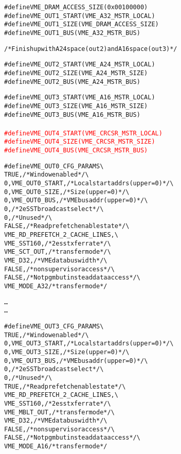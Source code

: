 \documentclass[11pt,a4paper]{article}
\begin{document}
\begin{framed}
\begin{alltt}
#define VME_DRAM_ACCESS_SIZE	(0x00100000)
#define VME_OUT1_START		(VME_A32_MSTR_LOCAL)
#define VME_OUT1_SIZE		(VME_DRAM_ACCESS_SIZE)
#define VME_OUT1_BUS            (VME_A32_MSTR_BUS)

/* Finish up with A24 space (out2) and A16 space (out3) */

#define VME_OUT2_START          (VME_A24_MSTR_LOCAL)
#define VME_OUT2_SIZE           (VME_A24_MSTR_SIZE)
#define VME_OUT2_BUS            (VME_A24_MSTR_BUS)

#define VME_OUT3_START          (VME_A16_MSTR_LOCAL)
#define VME_OUT3_SIZE           (VME_A16_MSTR_SIZE)
#define VME_OUT3_BUS            (VME_A16_MSTR_BUS)
\textcolor{red}{
#define VME_OUT4_START          (VME_CRCSR_MSTR_LOCAL)
#define VME_OUT4_SIZE           (VME_CRCSR_MSTR_SIZE)
#define VME_OUT4_BUS            (VME_CRCSR_MSTR_BUS)
}
    
#define VME_OUT0_CFG_PARAMS \verb|\|
             TRUE,                   /* Window enabled */ \verb|\|
             0, VME_OUT0_START,      /* Local start addrs (upper = 0) */ \verb|\|
             0, VME_OUT0_SIZE,       /* Size (upper = 0) */ \verb|\|
             0, VME_OUT0_BUS,        /* VME bus addr (upper = 0) */ \verb|\|
             0,                      /* 2eSST broadcast select */ \verb|\|
             0,                      /* Unused */ \verb|\|
             FALSE,                  /* Read prefetch enable state */ \verb|\|
             VME_RD_PREFETCH_2_CACHE_LINES, \verb|\|
             VME_SST160,             /* 2esst xfer rate */ \verb|\|
             VME_SCT_OUT,            /* transfer mode */ \verb|\|
             VME_D32,                /* VME data bus width */ \verb|\|
             FALSE,                  /* nonsupervisor access */ \verb|\|
             FALSE,                  /* Not pgm but instead data access */ \verb|\|
             VME_MODE_A32            /* transfer mode */

                               \ldots
                               \ldots
                                  
#define VME_OUT3_CFG_PARAMS \verb|\|
             TRUE,                   /* Window enabled */ \verb|\|
             0, VME_OUT3_START,      /* Local start addrs (upper = 0) */ \verb|\|
             0, VME_OUT3_SIZE,       /* Size (upper = 0) */ \verb|\|
             0, VME_OUT3_BUS,        /* VME bus addr (upper = 0) */ \verb|\|
             0,                      /* 2eSST broadcast select */ \verb|\|
             0,                      /* Unused */ \verb|\|
             TRUE,                   /* Read prefetch enable state */ \verb|\|
             VME_RD_PREFETCH_2_CACHE_LINES, \verb|\|
             VME_SST160,             /* 2esst xfer rate */ \verb|\|
             VME_MBLT_OUT,           /* transfer mode */ \verb|\|
             VME_D32,                /* VME data bus width */ \verb|\|
             FALSE,                  /* nonsupervisor access */ \verb|\|
             FALSE,                  /* Not pgm but instead data access */ \verb|\|
             VME_MODE_A16            /* transfer mode */
  

\end{alltt}
\end{framed}
\end{document}
